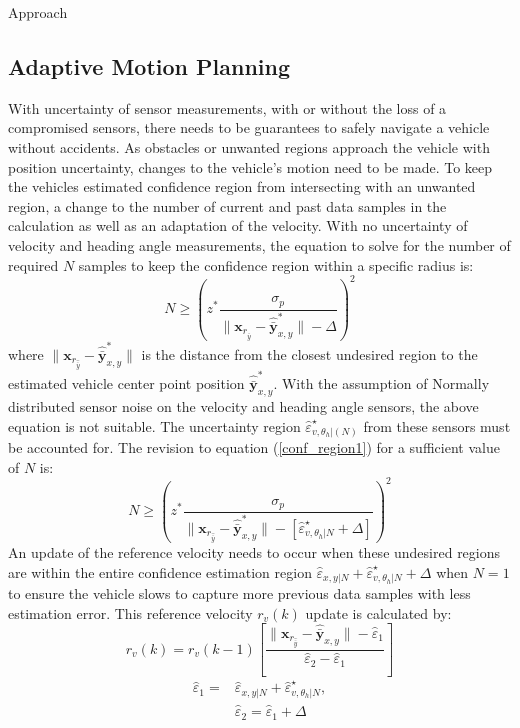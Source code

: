 \begin{section}{Approach}
\subsection{Adaptive Motion Planning}
With uncertainty of sensor measurements, with or without the loss of a compromised sensors, there needs to be guarantees to safely navigate a vehicle without accidents. As obstacles or unwanted regions approach the vehicle with position uncertainty, changes to the vehicle's motion need to be made. To keep the vehicles estimated confidence region from intersecting with an unwanted region, a change to the number of current and past data samples in the calculation as well as an adaptation of the velocity. With no uncertainty of velocity and heading angle measurements, the equation to solve for the number of required $N$ samples to keep the confidence region within a specific radius is:
    \begin{equation}
    \label{conf_region1}
	    N \geq \left(z^{*} \frac{ \sigma_p }{ {\lVert \bm{x}_{r_{\hat{\bar{y}}}} - \hat{\bar{\bm{y}}}_{x,y}^* \rVert} -\Delta } \right)^2
	\end{equation}
where $\lVert {\bm{x}_{r_{\hat{\bar{y}}}}-\hat{\bar{\bm{y}}}_{x,y}^*} \rVert$ is the distance from the closest undesired region to the estimated vehicle center point position $\hat{\bar{\bm{y}}}_{x,y}^*$.
With the assumption of Normally distributed sensor noise on the velocity and heading angle sensors, the above equation is not suitable. The uncertainty region $\hat{\varepsilon}_{v,\theta_h|(N)}^{\star}$ from these sensors must be accounted for. The revision to equation (\ref{conf_region1}) for a sufficient value of $N$ is:
    \begin{equation}
	    N \geq \left(z^{*} \frac{ \sigma_p }{ {\lVert \bm{x}_{r_{\hat{\bar{y}}}} - \hat{\bar{\bm{y}}}_{x,y}^* \rVert} -[\hat{\varepsilon}_{v,\theta_h|N}^{\star}+\Delta] } \right)^2
	\end{equation}
An update of the reference velocity needs to occur when these undesired regions are within the entire confidence estimation region $ \hat{\varepsilon}_{x,y|N} +\hat{\varepsilon}_{v,\theta_h|N}^{\star}+\Delta$ when $N=1$ to ensure the vehicle slows to capture more previous data samples with less estimation error. This reference velocity $r_v(k)$ update is calculated by:
    \begin{equation}
	    r_v(k)=r_v(k-1) \left[ \frac{\lVert \bm{x}_{r_{\hat{\bar{y}}}} - \hat{\bar{\bm{y}}}_{x,y} \rVert - \hat{\varepsilon}_1}{\hat{\varepsilon}_2 - \hat{\varepsilon}_1} \right]
	\end{equation}
	\begin{equation}
	\begin{split}
	    \hat{\varepsilon}_1=&\hat{\varepsilon}_{x,y|N} +\hat{\varepsilon}_{v,\theta_h|N}^{\star},\\ &\hat{\varepsilon}_2=\hat{\varepsilon}_1+\Delta \nonumber	    
	\end{split}
	\end{equation}
	

\end{section}
